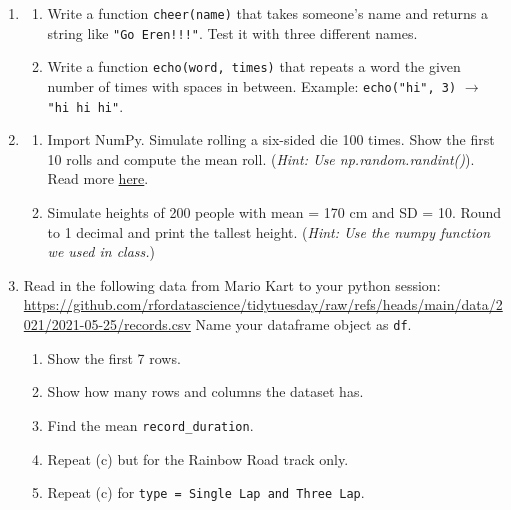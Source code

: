\documentclass[12pt]{article}
\begin{document}
\begin{enumerate}[leftmargin=1.2em, label=\textbf{\arabic*.}]
  \item 
  \begin{enumerate}
    \item Write a function \texttt{cheer(name)} that takes someone’s name and returns a string like \texttt{"Go Eren!!!"}. Test it with three different names. \vspace{2cm}
    \item Write a function \texttt{echo(word, times)} that repeats a word the given number of times with spaces in between. Example: \texttt{echo("hi", 3)} $\to$ \texttt{"hi hi hi"}. \vspace{3cm}
  \end{enumerate}

  \item
  \begin{enumerate}
    \item Import NumPy. Simulate rolling a six-sided die 100 times. Show the first 10 rolls and compute the mean roll. (\textit{Hint: Use np.random.randint()}). Read more \href{https://numpy.org/doc/2.3/reference/random/generated/numpy.random.randint.html}{here}. \vspace{2.5cm}
    \item Simulate heights of 200 people with mean = 170 cm and SD = 10. Round to 1 decimal and print the tallest height. (\textit{Hint: Use the numpy function we used in class.}) \vspace{2.5cm}
  \end{enumerate}

  \item Read in the following data from Mario Kart to your python session:  
 \url{https://github.com/rfordatascience/tidytuesday/raw/refs/heads/main/data/2021/2021-05-25/records.csv} Name your dataframe object as \texttt{df}.
  \begin{enumerate}
    \item Show the first 7 rows. \vspace{1.5cm}
    \item Show how many rows and columns the dataset has. \vspace{1.5cm}
    \item Find the mean \texttt{record\_duration}. \vspace{1.5cm}
    \item Repeat (c) but for the Rainbow Road track only. \vspace{1.5cm}
    \item Repeat (c) for \texttt{type = Single Lap and Three Lap}. \vspace{1.5cm}
  \end{enumerate}


\end{enumerate}
\end{document}
